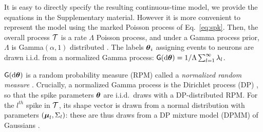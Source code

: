 % 
It is easy to directly specify the resulting continuous-time model, we provide the equations in the Supplementary material. 
However it is more convenient to represent the model using the marked Poisson process of Eq.~\eqref{eq:spk}. %
Then, the overall process $\mathcal{T}$ is a rate $\Lambda$ Poisson process,
and under a Gamma process prior, $\Lambda$ is Gamma$(\alpha,1)$ distributed %
\citep{Ferguson73}.
The labels $\boldsymbol{\theta}_i$ assigning events to neurons are drawn i.i.d. from a normalized Gamma 
process: %
$ \mathsf{G}(\mathrm{d} \boldsymbol{\theta}) = 1/\Lambda \sum_{l=1}^{\infty} \lambda_l$.

$\mathsf{G}(\mathrm{d} \boldsymbol{\theta})$ is a random probability measure (RPM) called a \emph{normalized random measure} \citep{JamesLP09}. Crucially, a 
normalized Gamma process is the Dirichlet process (DP) \citep{Ferguson73}, so that 
the spike parameters $\boldsymbol{\theta}$ are i.i.d.\ draws with a DP-distributed RPM.
For the $l^{th}$ spike in $\mathcal{T}$, its shape vector is drawn from a normal distribution
with parameters $(\boldsymbol{\mu}_{l}, \Sigma_{l})$: these are thus
draws from a DP mixture model (DPMM) of Gaussians \citep{Lo1984}.

